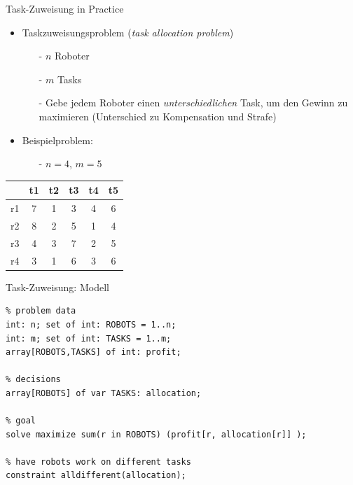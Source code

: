 \documentclass[handout,10pt,xcolor={dvipsnames},fleqn]{beamer}
\begin{document}
\begin{frame}{Task-Zuweisung in Practice}
\begin{itemize}
\item Taskzuweisungsproblem (\emph{task allocation problem})

\begin{itemize}
\item [-] $n$ Roboter
\item [-] $m$ Tasks
\item [-] Gebe jedem Roboter einen \emph{unterschiedlichen} Task, um den Gewinn zu maximieren (Unterschied zu Kompensation und Strafe)
\end{itemize}
\item Beispielproblem:
\begin{itemize}
\item[-] $n = 4$, $m = 5$
\end{itemize}
\end{itemize}
\centering
\begin{tabular}{|c|c|c|c|c|c|}
\hline 
 & t1 & t2 & t3 & t4 & t5 \\ 
\hline 
r1 & 7 & 1 & 3 & 4 & 6 \\ 
\hline 
r2 & 8 & 2 & 5 & 1 & 4 \\ 
\hline 
r3 & 4 & 3 & 7 & 2 & 5 \\ 
\hline 
r4 & 3 & 1 & 6 & 3 & 6 \\ 
\hline 
\end{tabular} 
\end{frame}


\begin{frame}[fragile]{Task-Zuweisung: Modell}
\begin{lstlisting}
% problem data 
int: n; set of int: ROBOTS = 1..n;
int: m; set of int: TASKS = 1..m;
array[ROBOTS,TASKS] of int: profit;

% decisions
array[ROBOTS] of var TASKS: allocation;

% goal
solve maximize sum(r in ROBOTS) (profit[r, allocation[r]] );

% have robots work on different tasks
constraint alldifferent(allocation);
\end{lstlisting}
\end{frame}
\end{document}
